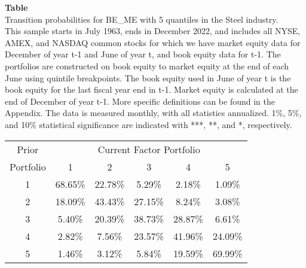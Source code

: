 \begin{table*}[ht!]
\raggedright
{}
\label{tab: transition_probs_BE_ME_Steel_with_5_quantiles}
\textbf{Table \thetable} \\
Transition probabilities for BE_ME with 5 quantiles in the Steel industry. \\
\hspace*{1em}This sample starts in July 1963, ends in December 2022, and includes all NYSE, AMEX, and NASDAQ common stocks for which we have market equity data for December of year t-1 and June of year t, and book equity data for t-1. The portfolios are constructed on book equity to market equity at the end of each June using quintile breakpoints.  The book equity used in June of year t is the book equity for the last fiscal year end in t-1.  Market equity is calculated at the end of December of year t-1.  More specific definitions can be found in the Appendix.  The data is measured monthly, with all statistics annualized.  1\%, 5\%, and 10\% statistical significance are indicated with ***, **, and *, respectively. \\
\vspace{0.5em}
\centering
\begin{adjustbox}{max width=\textwidth}
\begin{tabular}{@{}cccccc@{}}
\toprule
Prior & \multicolumn{5}{c}{Current Factor Portfolio} \\
Portfolio & 1 & 2 & 3 & 4 & 5 \\
\midrule
1 & 68.65\% & 22.78\% & 5.29\% & 2.18\% & 1.09\% \\
2 & 18.09\% & 43.43\% & 27.15\% & 8.24\% & 3.08\% \\
3 & 5.40\% & 20.39\% & 38.73\% & 28.87\% & 6.61\% \\
4 & 2.82\% & 7.56\% & 23.57\% & 41.96\% & 24.09\% \\
5 & 1.46\% & 3.12\% & 5.84\% & 19.59\% & 69.99\% \\
\bottomrule
\end{tabular}
\end{adjustbox}
\end{table*}
